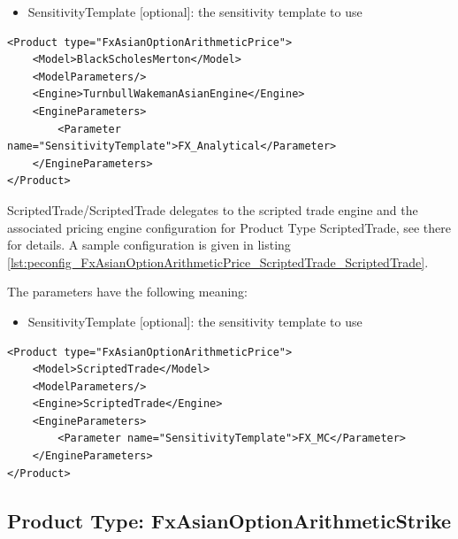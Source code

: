 \begin{itemize}
\item SensitivityTemplate [optional]: the sensitivity template to use
\end{itemize}

\begin{longlisting}
\begin{verbatim}
<Product type="FxAsianOptionArithmeticPrice">
    <Model>BlackScholesMerton</Model>
    <ModelParameters/>
    <Engine>TurnbullWakemanAsianEngine</Engine>
    <EngineParameters>
        <Parameter name="SensitivityTemplate">FX_Analytical</Parameter>
    </EngineParameters>
</Product>
\end{verbatim}
\caption{Configuration for Product FxAsianOptionArithmeticPrice, Model BlackScholesMerton, Engine TurnbullWakemanAsianEngine}
\label{lst:peconfig_FxAsianOptionArithmeticPrice_BlackScholesMerton_TurnbullWakemanAsianEngine}
\end{longlisting}

ScriptedTrade/ScriptedTrade delegates to the scripted trade engine and the associated pricing engine configuration for
Product Type ScriptedTrade, see there for details. A sample configuration is given in listing
\ref{lst:peconfig_FxAsianOptionArithmeticPrice_ScriptedTrade_ScriptedTrade}.

The parameters have the following meaning:

\begin{itemize}
\item SensitivityTemplate [optional]: the sensitivity template to use
\end{itemize}

\begin{longlisting}
\begin{verbatim}
<Product type="FxAsianOptionArithmeticPrice">
    <Model>ScriptedTrade</Model>
    <ModelParameters/>
    <Engine>ScriptedTrade</Engine>
    <EngineParameters>
        <Parameter name="SensitivityTemplate">FX_MC</Parameter>
    </EngineParameters>
</Product>
\end{verbatim}
\caption{Configuration for Product FxAsianOptionArithmeticPrice, Model ScriptedTrade, Engine ScriptedTrade}
\label{lst:peconfig_FxAsianOptionArithmeticPrice_ScriptedTrade_ScriptedTrade}
\end{longlisting}


\subsection{Product Type: FxAsianOptionArithmeticStrike}

